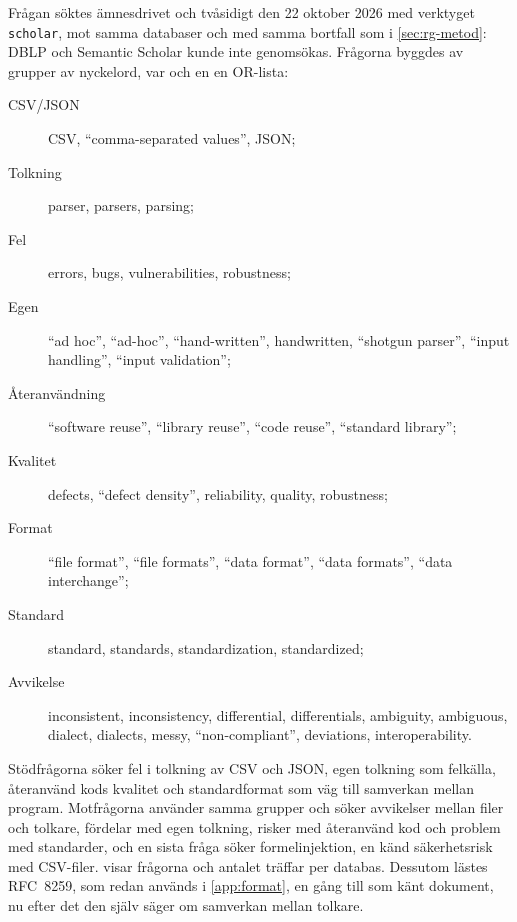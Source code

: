 Frågan söktes ämnesdrivet och tvåsidigt den 22 oktober 2026 med
verktyget \texttt{scholar}, mot samma databaser och med samma bortfall
som i \cref{sec:rg-metod}: DBLP och Semantic Scholar kunde inte
genomsökas.  Frågorna byggdes av grupper av nyckelord, var och en en
OR-lista:
\begin{description}
  \item[CSV/JSON] CSV, \enquote{comma-separated values}, JSON;
  \item[Tolkning] parser, parsers, parsing;
  \item[Fel] errors, bugs, vulnerabilities, robustness;
  \item[Egen] \enquote{ad hoc}, \enquote{ad-hoc}, \enquote{hand-written},
    handwritten, \enquote{shotgun parser}, \enquote{input handling},
    \enquote{input validation};
  \item[Återanvändning] \enquote{software reuse}, \enquote{library
    reuse}, \enquote{code reuse}, \enquote{standard library};
  \item[Kvalitet] defects, \enquote{defect density}, reliability,
    quality, robustness;
  \item[Format] \enquote{file format}, \enquote{file formats},
    \enquote{data format}, \enquote{data formats}, \enquote{data
    interchange};
  \item[Standard] standard, standards, standardization, standardized;
  \item[Avvikelse] inconsistent, inconsistency, differential,
    differentials, ambiguity, ambiguous, dialect, dialects, messy,
    \enquote{non-compliant}, deviations, interoperability.
\end{description}
Stödfrågorna söker fel i tolkning av CSV och JSON, egen tolkning som
felkälla, återanvänd kods kvalitet och standardformat som väg till
samverkan mellan program.  Motfrågorna använder samma grupper och söker
avvikelser mellan filer och tolkare, fördelar med egen tolkning,
risker med återanvänd kod och problem med standarder, och en sista
fråga söker formelinjektion, en känd säkerhetsrisk med CSV-filer.
 visar frågorna och antalet
träffar per databas.  Dessutom lästes RFC~8259, som redan används i
\cref{app:format}, en gång till som känt dokument, nu efter det den
själv säger om samverkan mellan tolkare.

